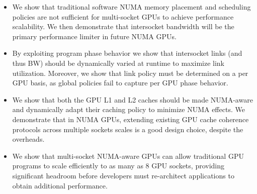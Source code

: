 \begin{itemize}

\item We show that traditional software NUMA memory placement and 
scheduling policies are not sufficient for multi-socket GPUs to achieve 
performance scalability.  We then demonstrate that intersocket bandwidth will be 
the primary performance limiter in future NUMA GPUs.

\item By exploiting program phase behavior we show that intersocket links (and 
thus BW) should be dynamically varied at runtime to maximize link 
utilization. Moreover, we show that link policy must be determined on a per 
GPU basis, as global policies fail to capture per GPU phase behavior.

\item We show that both the GPU L1 and L2 caches should be made NUMA-aware 
and dynamically adapt their caching policy to minimize NUMA effects. We demonstrate
that in NUMA GPUs, extending existing GPU cache coherence protocols
across multiple sockets scales is a good design choice, despite the overheads.

\item We show that multi-socket NUMA-aware GPUs can allow traditional 
GPU programs to scale efficiently to as many as 8 GPU sockets, providing significant 
headroom before developers must re-architect applications to obtain additional performance.

\end{itemize}

